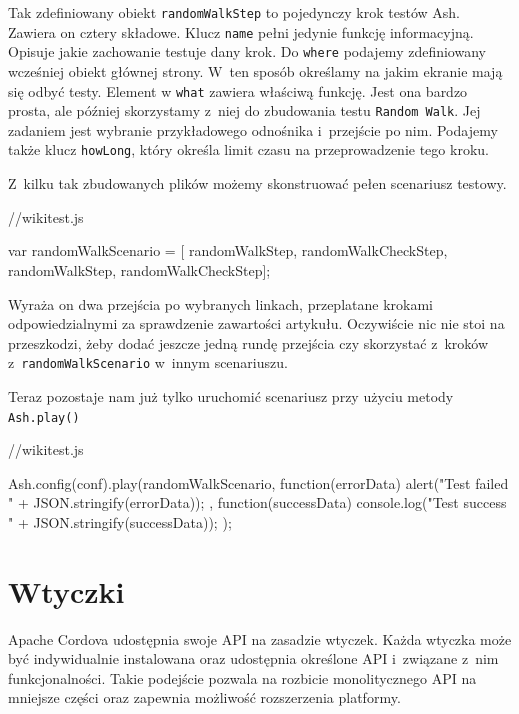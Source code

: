 \documentclass[brudnopis]{xmgr}
\begin{document}
Tak zdefiniowany obiekt \texttt{randomWalkStep} to pojedynczy krok testów Ash. Zawiera on cztery składowe. Klucz \texttt{name} pełni jedynie funkcję informacyjną. Opisuje jakie zachowanie testuje dany krok. Do \texttt{where} podajemy zdefiniowany wcześniej obiekt głównej strony. W~ten sposób określamy na jakim ekranie mają się odbyć testy. Element w \texttt{what} zawiera właściwą funkcję. Jest ona bardzo prosta, ale później skorzystamy z~niej do zbudowania testu \texttt{Random Walk}. Jej zadaniem jest wybranie przykładowego odnośnika i~przejście po nim. Podajemy także klucz \texttt{howLong}, który określa limit czasu na przeprowadzenie tego kroku.

Z~kilku tak zbudowanych plików możemy skonstruować pełen scenariusz testowy.

\begin{javascriptcode}
   //wikitest.js

   var randomWalkScenario = [
        randomWalkStep,
        randomWalkCheckStep,
        randomWalkStep,
        randomWalkCheckStep];

\end{javascriptcode}

Wyraża on dwa przejścia po wybranych linkach, przeplatane krokami odpowiedzialnymi za sprawdzenie zawartości artykułu. Oczywiście nic nie stoi na przeszkodzi, żeby dodać jeszcze jedną rundę przejścia czy skorzystać z~kroków z~\texttt{randomWalkScenario} w~innym scenariuszu.

Teraz pozostaje nam już tylko uruchomić scenariusz przy użyciu metody \texttt{Ash.play()}

\begin{javascriptcode}
   //wikitest.js

   Ash.config(conf).play(randomWalkScenario, function(errorData){
        alert("Test failed " + JSON.stringify(errorData));
    }, function(successData){
        console.log("Test success " + JSON.stringify(successData));
    });

\end{javascriptcode}

\chapter{Wtyczki}

Apache Cordova udostępnia swoje API na zasadzie wtyczek. Każda wtyczka może być indywidualnie instalowana oraz udostępnia określone API i~związane z~nim funkcjonalności. Takie podejście pozwala na rozbicie monolitycznego API na mniejsze części oraz zapewnia możliwość rozszerzenia platformy.
\end{document}

